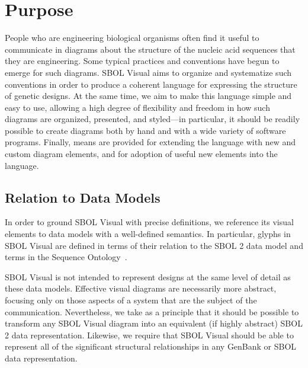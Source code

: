 \section{Purpose}

People who are engineering biological organisms often find it useful to communicate in
diagrams about the structure of the nucleic acid sequences that they are engineering.
%
Some typical practices and conventions have begun to emerge for such
diagrams.  SBOL Visual aims to organize and systematize such
conventions in order to produce a coherent language for expressing
the structure %
of genetic designs. 
%
At the same time, we aim to make this language simple and easy to use,
allowing a high degree of flexibility and freedom in how such diagrams are organized, presented, and
styled---in particular, it should be readily possible to create
diagrams both by hand and with a wide variety of software programs.
%
Finally, means are provided for extending the language with new and
custom diagram elements, and for adoption of useful new elements into
the language.

\subsection{Relation to Data Models}

In order to ground SBOL Visual with precise definitions, we reference its visual elements to data models with a well-defined semantics.
In particular, glyphs in SBOL Visual are defined in terms of their relation to the SBOL 2 data model and terms in the Sequence Ontology~\citep{SequenceOntology}.

SBOL Visual is not intended to represent designs at the same level of detail as these data models.
Effective visual diagrams are necessarily more abstract, focusing only on those aspects of a system that are the subject of the communication.
Nevertheless, we take as a principle that it should be possible to transform any SBOL Visual diagram into an equivalent (if highly abstract) SBOL 2 data representation.
Likewise, we require that SBOL Visual should be able to represent all of the significant structural relationships in any GenBank or SBOL data representation.
